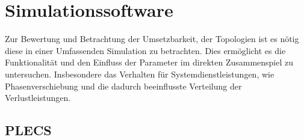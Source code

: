 \section{Simulationssoftware}
Zur Bewertung und Betrachtung der Umsetzbarkeit, der Topologien ist es nötig diese in einer Umfassenden Simulation zu betrachten. Dies ermöglicht es die Funktionalität und den Einfluss der Parameter im direkten Zusammenspiel zu untersuchen. Insbesondere das Verhalten für Systemdienstleistungen, wie Phasenverschiebung und die dadurch beeinflusste Verteilung der Verlustleistungen. 
	\subsection{PLECS}